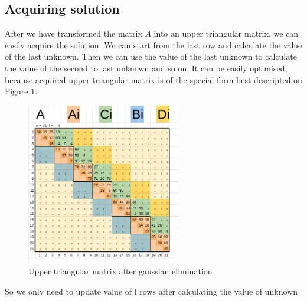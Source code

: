 \documentclass[11pt]{article}
\begin{document}
\subsection*{Acquiring solution}
After we have transformed the matrix $A$ into an upper triangular matrix, we can easily acquire the solution.
We can start from the last row and calculate the value of the last unknown.
Then we can use the value of the last unknown to calculate the value of the second to last unknown and so on.
It can be easily optimised, because acquired upper triangular matrix is of the special form best descripted on Figure $1$.
\begin{figure}[h]
    \centering
    \includegraphics[width=0.6\textwidth]{gauss_solution.png}
    \caption{Upper triangular matrix after gaussian elimination}
\end{figure}
So we only need to update value of l rows after calculating the value of unknown
\end{document}
